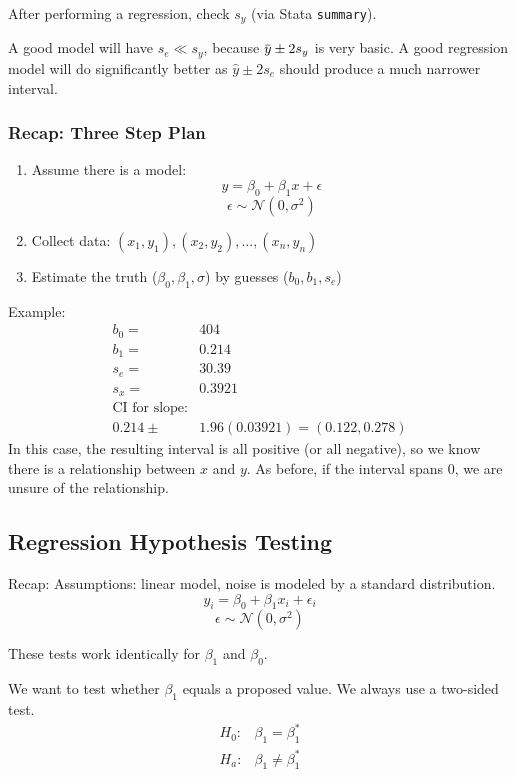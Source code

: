 \documentclass[11pt, oneside]{article}   	%
\newcommand{\overbar}[1]{\mkern 1.5mu\overline{\mkern-1.5mu#1\mkern-1.5mu}\mkern 1.5mu}
\begin{document}
After performing a regression, check $s_y$ (via Stata \texttt{summary}). 

A good model will have $s_e \ll s_y$, because $\overbar{y} \pm 2 s_y$ is very basic. A good regression model will do significantly better as $\hat{y} \pm 2 s_e$ should produce a much narrower interval.

\subsubsection{Recap: Three Step Plan}

\begin{enumerate}
\item{Assume there is a model: 
\[
y = \beta_0 + \beta_1 x + \epsilon
\]
\[
\epsilon \sim \mathcal{N}(0,\sigma^2)
\]}
\item{Collect data: $(x_1, y_1), (x_2, y_2), ... , (x_n, y_n)$}
\item{Estimate the truth ($\beta_0, \beta_1, \sigma$) by guesses ($b_0, b_1, s_e$)} 
\end{enumerate}

Example:
\begin{align*}
b_0 =& 404\\
b_1 =& 0.214\\
s_e =& 30.39\\
s_x =& 0.3921\\
\text{CI for slope:}\\
0.214 \pm& 1.96(0.03921) = (0.122, 0.278)
\end{align*}
In this case, the resulting interval is all positive (or all negative), so we know there is a relationship between $x$ and $y$. As before, if the interval spans 0, we are unsure of the relationship.

\subsection{Regression Hypothesis Testing}

Recap:
Assumptions: linear model, noise is modeled by a standard distribution.
\[
y_i = \beta_0 + \beta_1 x_i + \epsilon_i
\]
\[
\epsilon \sim \mathcal{N}(0,\sigma^2)
\]

These tests work identically for $\beta_1$ and $\beta_0$.

We want to test whether $\beta_1$ equals a proposed value. We always use a two-sided test.
\begin{align*}
H_0 : & \beta_1 = \beta_1^*\\
H_a : & \beta_1 \neq \beta_1^*\\
\end{align*}
\end{document}

